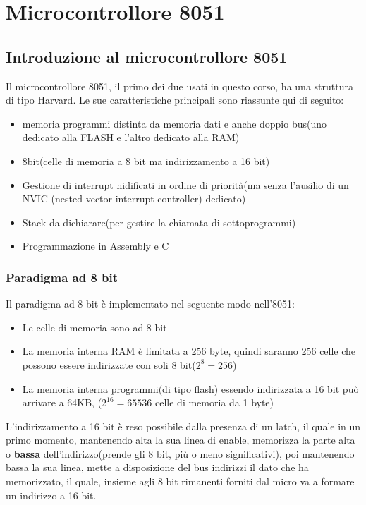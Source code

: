 \documentclass[main.tex]{subfiles}
\begin{document}
\chapter{Microcontrollore 8051}

\section{Introduzione al microcontrollore 8051}
Il microcontrollore 8051, il primo dei due usati in questo corso, ha una struttura di tipo Harvard. Le sue caratteristiche principali sono riassunte qui di seguito:
\begin{itemize}
    \item memoria programmi distinta da memoria dati e anche doppio bus(uno dedicato alla FLASH e l'altro dedicato alla RAM)
    \item 8bit(celle di memoria a 8 bit ma indirizzamento a 16 bit)
    \item Gestione di interrupt nidificati in ordine di priorità(ma senza l'ausilio di un NVIC (nested vector interrupt controller) dedicato)
    \item Stack da dichiarare(per gestire la chiamata di sottoprogrammi)
    \item Programmazione in Assembly e C 
\end{itemize}

\subsection{Paradigma ad 8 bit}
Il paradigma ad 8 bit è implementato nel seguente modo nell'8051:
\begin{itemize}
    \item Le celle di memoria sono ad 8 bit
    \item La memoria interna RAM è limitata a 256 byte, quindi saranno 256 celle che possono essere indirizzate con soli 8 bit($2^8=256$)
    \item La memoria interna programmi(di tipo flash) essendo indirizzata a 16 bit può arrivare a 64KB, ($2^{16}=65536$ celle di memoria da 1 byte)
\end{itemize}
L'indirizzamento a 16 bit è reso possibile dalla presenza di un latch, il quale in un primo momento, mantenendo alta la sua linea di enable, memorizza la parte alta o \textbf{bassa} dell'indirizzo(prende gli 8 bit, più o meno significativi), poi mantenendo bassa la sua linea, mette a disposizione del bus indirizzi il dato che ha memorizzato, il quale, insieme agli 8 bit rimanenti forniti dal micro va a formare un indirizzo a 16 bit.
\end{document}
